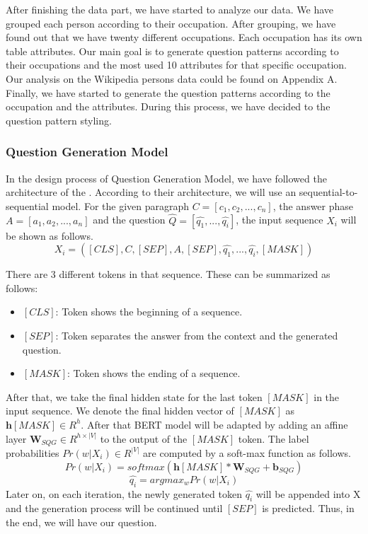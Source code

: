 \documentclass{mefsdp}
\begin{document}
	After finishing the data part, we have started to analyze our data. We have grouped each person according to their occupation. After grouping, we have found out that we have twenty different occupations. Each occupation has its own table attributes. Our main goal is to generate question patterns according to their occupations and the most used 10 attributes for that specific occupation. Our analysis on the Wikipedia persons data could be found on Appendix A.\\
	
	Finally, we have started to generate the question patterns according to the occupation and the attributes. During this process, we have decided to the question pattern styling.\\
	
	\subsubsection{Question Generation Model}
	In the design process of Question Generation Model, we have followed the architecture of the \cite{chan-fan-2019-recurrent}. According to their architecture, we will use an sequential-to-sequential model. For the given paragraph $C=[c_1, c_2, ..., c_n]$, the answer phase $A=[a_1, a_2, ..., a_n]$ and the question $\hat{Q} = [\hat{q_1}, ..., \hat{q_i}]$, the input sequence $X_i$ will be shown as follows.
	\begin{equation}
		X_i =  ([CLS], C, [SEP], A, [SEP], \hat{q_1}, ..., \hat{q_i}, [MASK])\label{formula1}
	\end{equation}

	 There are 3 different tokens in that sequence. These can be summarized as follows:
	\begin{itemize}
		\item \textit{$[CLS]$}: Token shows the beginning of a sequence.
		\item \textit{$[SEP]$}: Token separates the answer from the context and the generated question.
		\item \textit{$[MASK]$}: Token shows the ending of a sequence.
	\end{itemize}

	After that, we take the final hidden state for the last token \textit{$[MASK]$} in the input sequence. We denote the final hidden vector of \textit{$[MASK]$} as $\textbf{h}[MASK] \in \textit{R}^{h}$. After that BERT model will be adapted by adding an affine layer $\textbf{W}_{SQG} \in \textit{R}^{h×|V|}$ to the output of the \textit{$[MASK]$} token. The label probabilities  $Pr(w|X_i) \in \textit{R}^{|V|}$ are computed by a soft-max function as follows. 
	\begin{equation}
		Pr(w|X_i) = softmax(\textbf{h}[MASK] * \textbf{W}_{SQG} + \textbf{b}_{SQG})
	\end{equation}
	\begin{equation}
		\hat{q_i} = argmax_{w}Pr(w|X_i)
	\end{equation}
	Later on, on each iteration, the newly generated token $\hat{q_i}$ will be appended into X and the generation process will be continued until \textit{$[SEP]$} is predicted. Thus, in the end, we will have our question.
\end{document}

